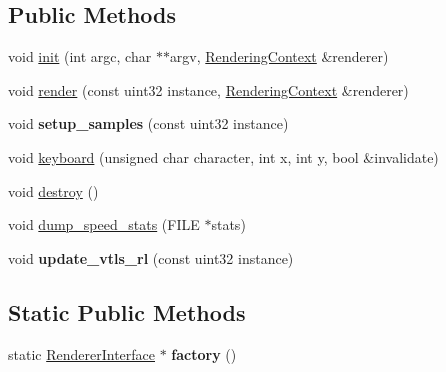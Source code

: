 \subsection*{Public Methods}
\begin{DoxyCompactItemize}
\item 
void \hyperlink{group___p_t_module_details_ga923b8d146b23f93356f6c74971c4d6f7}{init} (int argc, char $\ast$$\ast$argv, \hyperlink{struct_rendering_context}{Rendering\+Context} \&renderer)
\item 
void \hyperlink{group___p_t_module_details_ga3e6317495ea6c761968a893b3a54824e}{render} (const uint32 instance, \hyperlink{struct_rendering_context}{Rendering\+Context} \&renderer)
\item 
\mbox{\label{struct_path_tracer_a84595cdac7e983b4dcfa72677f4e7a87}} 
void {\bfseries setup\+\_\+samples} (const uint32 instance)
\item 
void \hyperlink{group___p_t_module_details_gad08f55d7ba075e0b71a4aa729c07986d}{keyboard} (unsigned char character, int x, int y, bool \&invalidate)
\item 
void \hyperlink{struct_path_tracer_a3c4e7e9eb10e92c6a6d5cc94bbf93ee7}{destroy} ()
\item 
void \hyperlink{group___p_t_module_details_gaae1782405577d0072ff78570ec0025cc}{dump\+\_\+speed\+\_\+stats} (F\+I\+LE $\ast$stats)
\item 
void {\bfseries update\+\_\+vtls\+\_\+rl} (const uint32 instance)
\end{DoxyCompactItemize}
\subsection*{Static Public Methods}
\begin{DoxyCompactItemize}
\item 
\mbox{\label{struct_path_tracer_a8b333c7f699b163f647af81a016cf83f}} 
static \hyperlink{struct_renderer_interface}{Renderer\+Interface} $\ast$ {\bfseries factory} ()
\end{DoxyCompactItemize}
